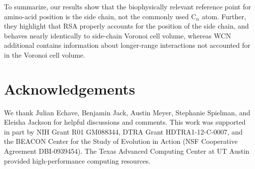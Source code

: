 \documentclass[12pt]{article}
\begin{document}
To summarize, our results show that the biophysically relevant reference point for amino-acid position is the side chain, not the commonly used C$_\alpha$ atom. Further, they highlight that RSA properly accounts for the position of the side chain, and behaves nearly identically to side-chain Voronoi cell volume, whereas WCN additional contains information about longer-range interactions not accounted for in the Voronoi cell volume.


\section*{Acknowledgements}

We thank Julian Echave, Benjamin Jack, Austin Meyer, Stephanie Spielman, and Eleisha Jackson for helpful discussions and comments. This work was supported in part by NIH Grant R01 GM088344, DTRA Grant HDTRA1-12-C-0007, and the BEACON Center for the Study of Evolution in Action (NSF Cooperative Agreement DBI-0939454). The Texas Advanced Computing Center at UT Austin provided high-performance computing resources.



\end{document}
